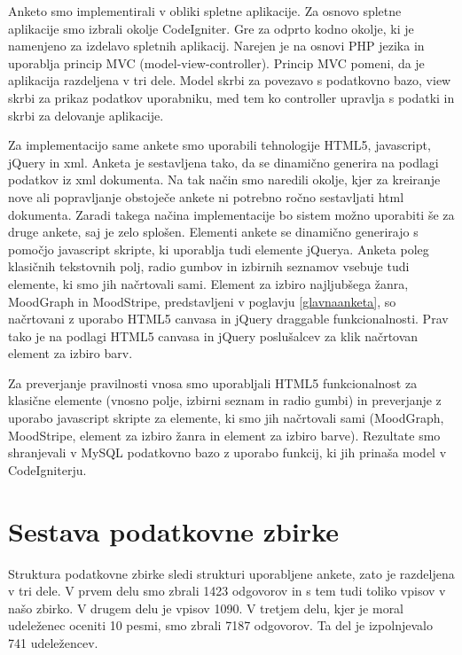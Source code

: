 \documentclass[a4paper, 12pt]{book}
\begin{document}
{Anketo smo implementirali v obliki spletne aplikacije. Za osnovo spletne aplikacije smo izbrali okolje CodeIgniter. Gre za odprto kodno okolje, ki je namenjeno za izdelavo spletnih aplikacij. Narejen je na osnovi PHP jezika in uporablja princip MVC (model-view-controller). Princip MVC pomeni, da je aplikacija razdeljena v tri dele. Model skrbi za povezavo s podatkovno bazo, view skrbi za prikaz podatkov uporabniku, med tem ko controller upravlja s podatki in skrbi za delovanje aplikacije.

Za implementacijo same ankete smo uporabili tehnologije HTML5, javascript, jQuery in xml. Anketa je sestavljena tako, da se dinamično generira na podlagi podatkov iz xml dokumenta. Na tak način smo naredili okolje, kjer za kreiranje nove ali popravljanje obstoječe ankete ni potrebno ročno sestavljati html dokumenta. Zaradi takega načina implementacije bo sistem možno uporabiti še za druge ankete, saj je zelo splošen. Elementi ankete se dinamično generirajo s pomočjo javascript skripte, ki uporablja tudi elemente jQuerya. Anketa poleg klasičnih tekstovnih polj, radio gumbov in izbirnih seznamov vsebuje tudi elemente, ki smo jih načrtovali sami. Element za izbiro najljubšega žanra, MoodGraph in MoodStripe, predstavljeni v poglavju \ref{glavnaanketa}, so načrtovani z uporabo HTML5 canvasa in jQuery draggable funkcionalnosti. Prav tako je na podlagi HTML5 canvasa in jQuery poslušalcev za klik načrtovan element za izbiro barv. 

Za preverjanje pravilnosti vnosa smo uporabljali HTML5 funkcionalnost za klasične elemente (vnosno polje, izbirni seznam in radio gumbi) in preverjanje z uporabo javascript skripte za elemente, ki smo jih načrtovali sami (MoodGraph, MoodStripe, element za izbiro žanra in element za izbiro barve). Rezultate smo shranjevali v MySQL podatkovno bazo z uporabo funkcij, ki jih prinaša model v CodeIgniterju. 


\section{Sestava podatkovne zbirke}

Struktura podatkovne zbirke sledi strukturi uporabljene ankete, zato je razdeljena v tri dele.  V prvem delu smo zbrali 1423 odgovorov in s tem tudi toliko vpisov v našo zbirko. V drugem delu je vpisov 1090. V tretjem delu, kjer je moral udeleženec oceniti 10 pesmi, smo zbrali 7187 odgovorov. Ta del je izpolnjevalo 741 udeležencev.

}
\end{document}
